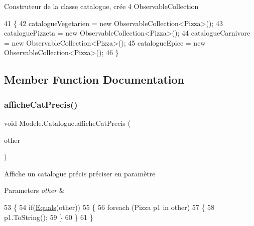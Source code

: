 Construteur de la classe catalogue, crée 4 Observable\+Collection 


\begin{DoxyCode}
41         \{ 
42             catalogueVegetarien = \textcolor{keyword}{new} ObservableCollection<Pizza>();
43             cataloguePizzeta = \textcolor{keyword}{new} ObservableCollection<Pizza>();
44             catalogueCarnivore = \textcolor{keyword}{new} ObservableCollection<Pizza>();
45             catalogueEpice = \textcolor{keyword}{new} ObservableCollection<Pizza>();
46         \}
\end{DoxyCode}


\subsection{Member Function Documentation}
\mbox{\label{classModele_1_1Catalogue_ab7da274b56b04b968d89d05dbdccf097}} 
\subsubsection{\texorpdfstring{affiche\+Cat\+Precis()}{afficheCatPrecis()}}
{\footnotesize\ttfamily void Modele.\+Catalogue.\+affiche\+Cat\+Precis (\begin{DoxyParamCaption}\item[{Observable\+Collection$<$ \hyperlink{classModele_1_1Pizza}{Pizza} $>$}]{other }\end{DoxyParamCaption})\hspace{0.3cm}{\ttfamily [inline]}}



Affiche un catalogue précis préciser en paramètre 


\begin{DoxyParams}{Parameters}
{\em other} & \\
\hline
\end{DoxyParams}

\begin{DoxyCode}
53         \{
54             \textcolor{keywordflow}{if}(\hyperlink{classModele_1_1Catalogue_a244cf5ce13ec8127f3585f3b5fa73dc9}{Equals}(other))
55             \{
56                 \textcolor{keywordflow}{foreach} (Pizza p1 \textcolor{keywordflow}{in} other)
57                 \{
58                     p1.ToString();
59                 \}
60             \}
61         \}
\end{DoxyCode}
\mbox{\label{classModele_1_1Catalogue_a244cf5ce13ec8127f3585f3b5fa73dc9}} 
